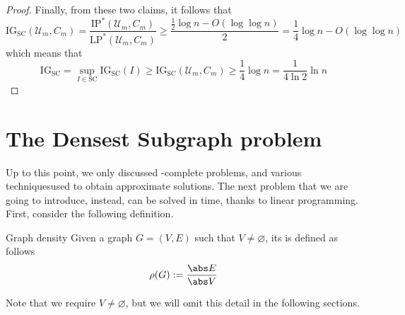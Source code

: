\documentclass[a4paper, 12pt]{report}
\begin{document}
\begin{proof}

        Finally, from these two claims, it follows that $$\mathrm{IG_{SC}}(\mathcal U_m, C_m) = \dfrac{\mathrm{IP^*}(\mathcal U_m, C_m)}{\mathrm{LP^*}(\mathcal U_m, C_m)} \ge \dfrac{\tfrac{1}{2} \log n - O(\log \log n)}{2} = \dfrac{1}{4} \log n - O(\log \log n)$$ which means that $$\mathrm{IG_{SC}} = \sup_{I \in \mathrm{SC}}{\mathrm{IG_{SC}}(I)} \ge \mathrm{IG_{SC}}(\mathcal U_m, C_m) \ge \dfrac{1}{4} \log n = \dfrac{1}{4 \ln 2} \ln n$$
    \end{proof}

    \section{The Densest Subgraph problem}
    
    Up to this point, we only discussed \NPclass-complete problems, and various techniquesused to obtain approximate solutions. The next problem that we are going to introduce, instead, can be solved in  time, thanks to linear programming. First, consider the following definition.

    \begin{frameddefn}{Graph density}
        Given a graph $G = (V, E)$ such that $V \neq \varnothing$, its  is defined as follows $$\rho(G) := \dfrac{\abs E}{\abs V}$$
    \end{frameddefn}

    Note that we require $V \neq \varnothing$, but we will omit this detail in the following sections.
\end{document}
